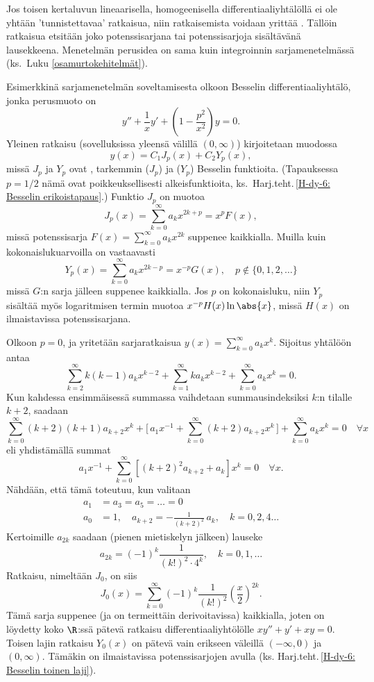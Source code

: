 Jos toisen kertaluvun lineaarisella, homogeenisella differentiaaliyhtälöllä ei ole yhtään 
'tunnistettavaa' ratkaisua, niin ratkaisemista voidaan yrittää .
Tällöin ratkaisua etsitään joko potenssisarjana tai potenssisarjoja sisältävänä lausekkeena.
Menetelmän perusidea on sama kuin integroinnin sarjamenetelmässä 
(ks.\ Luku \ref{osamurtokehitelmät}).

Esimerkkinä sarjamenetelmän soveltamisesta olkoon Besselin differentiaaliyhtälö, jonka
perusmuoto on
\[
y''+\frac{1}{x}y'+(1-\frac{p^2}{x^2})y=0.
\]
Yleinen ratkaisu (sovelluksissa yleensä välillä $(0,\infty)$) kirjoitetaan muodossa
\[
y(x)=C_1 J_p(x)+C_2 Y_p(x),
\]
missä $J_p$ ja $Y_p$ ovat
%
, tarkemmin  ($J_p$)
ja  ($Y_p$) Besselin funktioita. (Tapauksessa $p=1/2$ nämä ovat 
poikkeuksellisesti alkeisfunktioita, ks.\ Harj.teht.\,\ref{H-dy-6: Besselin erikoistapaus}.)
Funktio $J_p$ on muotoa
\[
J_p(x)=\sum_{k=0}^\infty a_kx^{2k+p}=x^p F(x),
\]
missä potenssisarja $F(x)=\sum_{k=0}^\infty a_kx^{2k}$ suppenee kaikkialla. Muilla kuin 
kokonaislukuarvoilla on vastaavasti
\[
Y_p(x)=\sum_{k=0}^\infty a_kx^{2k-p}=x^{-p} G(x),\quad p\notin \{0,1,2,\ldots\}
\] 
missä $G$:n sarja jälleen suppenee kaikkialla. Jos $p$ on kokonaisluku, niin $Y_p$ sisältää
myös logaritmisen termin muotoa $x^{-p}H(x)\ln\abs{x}$, missä $H(x)$ on ilmaistavissa 
potenssisarjana.

Olkoon $p=0$, ja yritetään sarjaratkaisua $y(x)=\sum_{k=0}^\infty a_kx^k$.
Sijoitus yhtälöön antaa
\[
\sum_{k=2}^\infty k(k-1)a_kx^{k-2}+\sum_{k=1}^\infty ka_kx^{k-2}+\sum_{k=0}^\infty a_kx^k=0.
\]
Kun kahdessa ensimmäisessä summassa vaihdetaan summausindeksiksi $k$:n tilalle $k+2$, saadaan
\[
\sum_{k=0}^\infty (k+2)(k+1)a_{k+2}x^k+\bigl[\,a_1x^{-1}+\sum_{k=0}^\infty (k+2)a_{k+2}x^k\,\bigr] 
                                                 + \sum_{k=0}^\infty a_kx^k=0 \quad \forall x
\]
eli yhdistämällä summat
\[
a_1x^{-1}+\sum_{k=0}^\infty [(k+2)^2a_{k+2}+a_k]x^k = 0\quad\forall x.
\]
Nähdään, että tämä toteutuu, kun valitaan
\begin{align*}
a_1 &= a_3=a_5=\ldots =0 \\
a_0 &= 1,\quad a_{k+2}=-\frac{1}{(k+2)^2}\,a_k,\quad k=0,2,4 \ldots
\end{align*}
Kertoimille $a_{2k}$ saadaan (pienen mietiskelyn jälkeen) lauseke
\[
a_{2k}=(-1)^k\frac{1}{(k!)^2\cdot 4^k},\quad k=0,1,\ldots
\]
Ratkaisu, nimeltään $J_0$, on siis
\[
J_0(x)=\sum_{k=0}^\infty (-1)^k\frac{1}{(k!)^2}\left(\frac{x}{2}\right)^{2k}.
\]
Tämä sarja suppenee (ja on termeittäin derivoitavissa) kaikkialla, joten on löydetty
koko $\R$:ssä pätevä ratkaisu differentiaaliyhtölölle $xy''+y'+xy=0$. Toisen lajin ratkaisu
$Y_0(x)$ on pätevä vain erikseen väleillä $(-\infty,0)$ ja $(0,\infty)$. Tämäkin on 
ilmaistavissa potenssisarjojen avulla (ks. Harj.teht.\,\ref{H-dy-6: Besselin toinen laji}).

